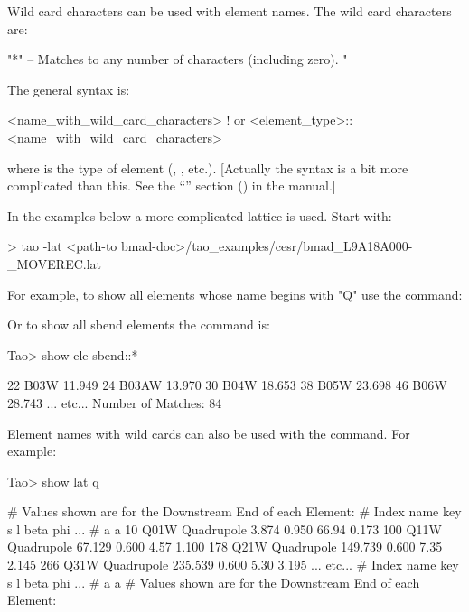 \documentclass{hitec}     %
\begin{document}
Wild card characters can be used with element names. The wild card characters  are:
\begin{code}
"*" -- Matches to any number of characters (including zero).
"%
\end{code}
The general syntax is:
\begin{code}
  <name_with_wild_card_characters>                  ! or
  <element_type>::<name_with_wild_card_characters>
\end{code}
where  is the type of element (, , etc.). [Actually the
syntax is a bit more complicated than this. See the ``'' section () in the \bmad manual.]

In the examples below a more complicated lattice is used. Start \tao with:
\begin{code}
  > tao -lat <path-to bmad-doc>/tao_examples/cesr/bmad_L9A18A000-_MOVEREC.lat
\end{code}
For example, to show all elements whose name begins with "Q" use the  command:

Or to show all sbend elements the command is:
\begin{code}  
Tao> show ele sbend::*

        22  B03W                                            11.949
        24  B03AW                                           13.970
        30  B04W                                            18.653
        38  B05W                                            23.698
        46  B06W                                            28.743
... etc...
Number of Matches: 84
\end{code}

Element names with wild cards can also be used with the  command. For example:
\begin{code}
Tao> show lat q%

# Values shown are for the Downstream End of each Element:
# Index  name   key                   s       l    beta     phi ...  
#                                                     a       a
    10  Q01W Quadrupole            3.874   0.950   66.94   0.173  
   100  Q11W Quadrupole           67.129   0.600    4.57   1.100  
   178  Q21W Quadrupole          149.739   0.600    7.35   2.145  
   266  Q31W Quadrupole          235.539   0.600    5.30   3.195  
   ... etc...
# Index  name   key                   s       l    beta     phi ...  
#                                                     a       a
# Values shown are for the Downstream End of each Element:
\end{code}
\end{document}
